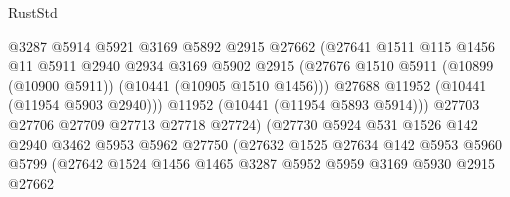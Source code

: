 \begin{lexlean}{RustStd}
\begin{coremodule}
                                  @3287
                                  @5914
                                  @5921
                                  @3169
                                  @5892
                                  @2915
                                  @27662
                                  (@27641
                                    @1511
                                    @115
                                    @1456
                                    @11
                                    @5911
                                    @2940
                                    @2934
                                    @3169
                                    @5902
                                    @2915
                                    (@27676
                                      @1510
                                      @5911
                                      (@10899 (@10900 @5911))
                                      (@10441 (@10905 @1510 @1456)))
                                    @27688
                                    @11952
                                    (@10441 (@11954 @5903 @2940)))
                                  @11952
                                  (@10441 (@11954 @5893 @5914)))
                                @27703
                                @27706
                                @27709
                                @27713
                                @27718
                                @27724)
                              (@27730
                                @5924
                                @531
                                @1526
                                @142
                                @2940
                                @3462
                                @5953
                                @5962
                                @27750
                                (@27632
                                  @1525
                                  @27634
                                  @142
                                  @5953
                                  @5960
                                  @5799
                                  (@27642
                                    @1524
                                    @1456
                                    @1465
                                    @3287
                                    @5952
                                    @5959
                                    @3169
                                    @5930
                                    @2915
                                    @27662

\end{coremodule}
\end{lexlean}
